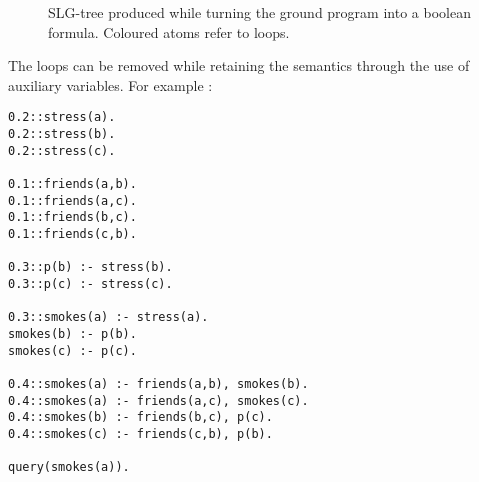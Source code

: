 \begin{figure}[H]
\begin{tikzpicture}
\end{tikzpicture}
\caption{SLG-tree produced while turning the ground program into a boolean formula. Coloured atoms refer to loops.}
\label{fig:nestedtries}
\end{figure}

\noindent The loops can be removed while retaining the semantics through the use of auxiliary variables. For example :
\begin{code}
\begin{multicols}{2}
\begin{verbatim}
0.2::stress(a).
0.2::stress(b).
0.2::stress(c).

0.1::friends(a,b).
0.1::friends(a,c).
0.1::friends(b,c).
0.1::friends(c,b).

0.3::p(b) :- stress(b).
0.3::p(c) :- stress(c).

0.3::smokes(a) :- stress(a).
smokes(b) :- p(b).
smokes(c) :- p(c).

0.4::smokes(a) :- friends(a,b), smokes(b).
0.4::smokes(a) :- friends(a,c), smokes(c).
0.4::smokes(b) :- friends(b,c), p(c).
0.4::smokes(c) :- friends(c,b), p(b).

query(smokes(a)).
\end{verbatim}
\end{multicols}
\label{code:base}
\vspace{0.5cm}
\end{code}

